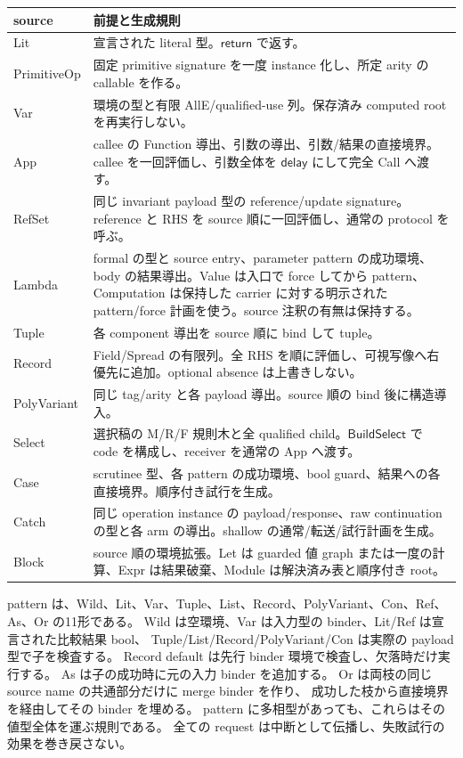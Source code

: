 \documentclass[11pt,a4paper]{article}
\newcommand{\Ret}{\mathsf{return}}
\newcommand{\Delay}{\mathsf{delay}}
\begin{document}
\begin{longtable}{>{\raggedright\arraybackslash}p{}>{\raggedright\arraybackslash}p{}}
\toprule source & 前提と生成規則 \\
\midrule\endhead
Lit & 宣言された literal 型。\(\Ret\) で返す。\\
PrimitiveOp & 固定 primitive signature を一度 instance 化し、所定 arity の callable を作る。\\
Var & 環境の型と有限 AllE/qualified-use 列。保存済み computed root を再実行しない。\\
App & callee の Function 導出、引数の導出、引数/結果の直接境界。callee を一回評価し、引数全体を \(\Delay\) にして完全 Call へ渡す。\\
RefSet & 同じ invariant payload 型の reference/update signature。reference と RHS を source 順に一回評価し、通常の protocol を呼ぶ。\\
Lambda & formal の型と source entry、parameter pattern の成功環境、body の結果導出。Value は入口で force してから pattern、Computation は保持した carrier に対する明示された pattern/force 計画を使う。source 注釈の有無は保持する。\\
Tuple & 各 component 導出を source 順に bind して tuple。\\
Record & Field/Spread の有限列。全 RHS を順に評価し、可視写像へ右優先に追加。optional absence は上書きしない。\\
PolyVariant & 同じ tag/arity と各 payload 導出。source 順の bind 後に構造導入。\\
Select & 選択稿の M/R/F 規則木と全 qualified child。\(\mathsf{BuildSelect}\) で code を構成し、receiver を通常の App へ渡す。\\
Case & scrutinee 型、各 pattern の成功環境、bool guard、結果への各直接境界。順序付き試行を生成。\\
Catch & 同じ operation instance の payload/response、raw continuation の型と各 arm の導出。shallow の通常/転送/試行計画を生成。\\
Block & source 順の環境拡張。Let は guarded 値 graph または一度の計算、Expr は結果破棄、Module は解決済み表と順序付き root。\\
\bottomrule
\end{longtable}

pattern は、Wild、Lit、Var、Tuple、List、Record、PolyVariant、Con、Ref、As、Or の11形である。
Wild は空環境、Var は入力型の binder、Lit/Ref は宣言された比較結果 bool、
Tuple/List/Record/PolyVariant/Con は実際の payload 型で子を検査する。
Record default は先行 binder 環境で検査し、欠落時だけ実行する。
As は子の成功時に元の入力 binder を追加する。
Or は両枝の同じ source name の共通部分だけに merge binder を作り、
成功した枝から直接境界を経由してその binder を埋める。
pattern に多相型があっても、これらはその値型全体を運ぶ規則である。
全ての request は中断として伝播し、失敗試行の効果を巻き戻さない。
\end{document}
